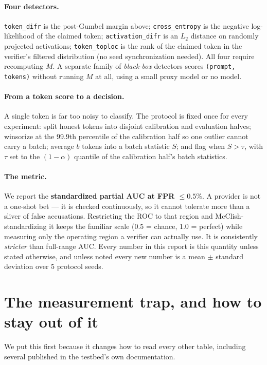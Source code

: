 \documentclass[11pt]{article}
\newcommand{\td}{\texttt{token\_difr}}
\newcommand{\ce}{\texttt{cross\_entropy}}
\newcommand{\ad}{\texttt{activation\_difr}}
\newcommand{\tl}{\texttt{token\_toploc}}
\begin{document}
\paragraph{Four detectors.} \td{} is the post-Gumbel margin above; \ce{} is the
negative log-likelihood of the claimed token; \ad{} is an $L_2$ distance on randomly
projected activations; \tl{} is the rank of the claimed token in the verifier's
filtered distribution (no seed synchronization needed). All four require recomputing
$M$. A separate family of \emph{black-box} detectors scores
\texttt{(prompt, tokens)} without running $M$ at all, using a small proxy model or
no model.

\paragraph{From a token score to a decision.} A single token is far too noisy to
classify. The protocol is fixed once for every experiment: split honest tokens into
disjoint calibration and evaluation halves; winsorize at the 99.9th percentile of
the calibration half so one outlier cannot carry a batch; average $b$ tokens into a
batch statistic $S$; and flag when $S > \tau$, with $\tau$ set to the
$(1-\alpha)$ quantile of the calibration half's batch statistics.

\paragraph{The metric.} We report the \textbf{standardized partial AUC at
FPR $\le 0.5\%$}. A provider is not a one-shot bet --- it is checked continuously,
so it cannot tolerate more than a sliver of false accusations. Restricting the ROC
to that region and McClish-standardizing it keeps the familiar scale (0.5 = chance,
1.0 = perfect) while measuring only the operating region a verifier can actually
use. It is consistently \emph{stricter} than full-range AUC. Every number in this
report is this quantity unless stated otherwise, and unless noted every new number
is a mean $\pm$ standard deviation over 5 protocol seeds.

\section{The measurement trap, and how to stay out of it}
\label{sec:trap}

We put this first because it changes how to read every other table, including
several published in the testbed's own documentation.
\end{document}
